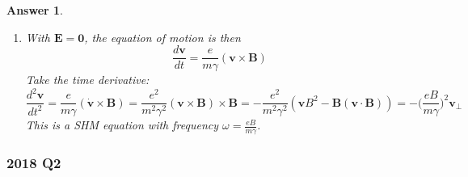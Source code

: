\documentclass[a4paper]{article}
\newtheorem{ans}{Answer}[section]
\theoremstyle{new}
\begin{document}
\begin{ans}
\begin{enumerate}[label=(\alph*)]
where $|\mathbf{v}|^2=c^2(1-\gamma^{-2})$. Since $\gamma\neq1$, we must have $\frac{d\gamma}{dt}=0$, i.e. $\gamma$ and in turn $v$ are both constants. 
\item With $\mathbf{E}=\boldsymbol{0}$, the equation of motion is then
$$\frac{d\mathbf{v}}{dt}=\frac{e}{m\gamma}(\mathbf{v}\times\mathbf{B})$$
Take the time derivative:
$$\frac{d^2\mathbf{v}}{dt^2}=\frac{e}{m\gamma}(\mathbf{\dot{v}}\times\mathbf{B})=\frac{e^2}{m^2\gamma^2}(\mathbf{v}\times\mathbf{B})\times\mathbf{B}=-\frac{e^2}{m^2\gamma^2}(\mathbf{v}B^2-\mathbf{B}(\mathbf{v}\cdot\mathbf{B}))=-\bigg(\frac{eB}{m\gamma}\bigg)^2\mathbf{v_\perp}$$
This is a SHM equation with frequency $\omega=\frac{eB}{m\gamma}$.
\end{enumerate}
\end{ans}
\newpage
\subsubsection*{2018 Q2}
\end{document}
